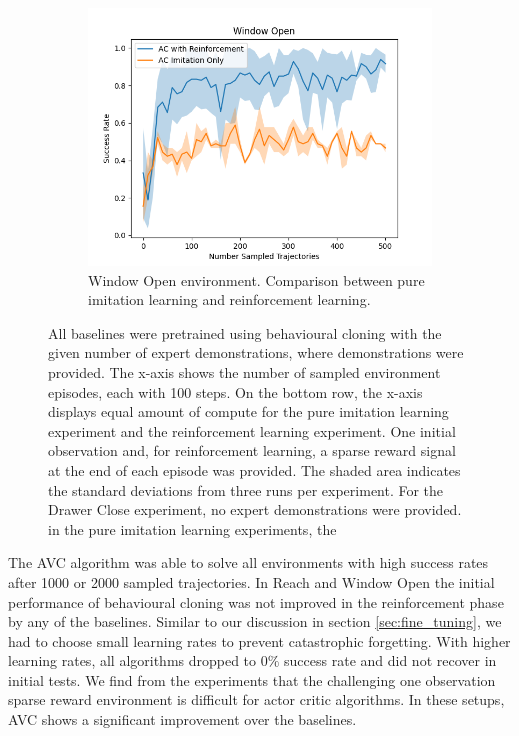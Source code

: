\begin{figure}[htbp]
\begin{subfigure}[t]{0.45\textwidth}
      \includegraphics[width=\textwidth]{images/1_2000_imi/Window Open.png}
      \caption{Window Open environment. Comparison between pure imitation learning and reinforcement learning.}
    \end{subfigure}
    \caption{
    All baselines were pretrained using behavioural cloning with the given number of expert demonstrations, where demonstrations were provided. 
    The x-axis shows the number of sampled environment episodes, each with 100 steps. On the bottom row, 
    the x-axis displays equal amount of compute for the pure imitation learning experiment and the reinforcement learning experiment. 
    One initial observation and, for reinforcement learning, a sparse reward signal at the end of each episode was provided. 
    The shaded area indicates the standard deviations from three runs per experiment. 
    For the Drawer Close experiment, no expert demonstrations were provided. in the pure imitation learning experiments, the }
    \label{fig:guided_ref}
\end{figure}

The AVC algorithm was able to solve all environments with high success rates after 1000 or 2000 sampled trajectories. In Reach and Window Open the initial performance
of behavioural cloning was not improved in the reinforcement phase by any of the baselines. Similar to our discussion in section \ref{sec:fine_tuning},
we had to choose small learning rates to prevent catastrophic forgetting. With higher learning rates, all algorithms dropped to $0 \%$ success rate and did
not recover in initial tests. We find from the experiments that the challenging one observation sparse reward environment is difficult for
actor critic algorithms. In these setups, AVC shows a significant improvement over the baselines.\\

